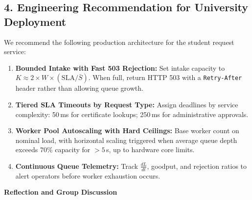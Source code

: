 \documentclass[11pt]{article}
\begin{document}
\subsection*{4. Engineering Recommendation for University Deployment}
We recommend the following production architecture for the student request service:
\begin{enumerate}[leftmargin=1.4em, itemsep=0.15em]
    \item \textbf{Bounded Intake with Fast 503 Rejection:} Set intake capacity to $K \approx 2 \times W \times (\text{SLA} / \bar{S})$. When full, return HTTP 503 with a \texttt{Retry-After} header rather than allowing queue growth.
    \item \textbf{Tiered SLA Timeouts by Request Type:} Assign deadlines by service complexity: 50\,ms for certificate lookups; 250\,ms for administrative approvals.
    \item \textbf{Worker Pool Autoscaling with Hard Ceilings:} Base worker count on nominal load, with horizontal scaling triggered when average queue depth exceeds 70\% capacity for $>5$\,s, up to hardware core limits.
    \item \textbf{Continuous Queue Telemetry:} Track $\frac{dL}{dt}$, goodput, and rejection ratios to alert operators before worker exhaustion occurs.
\end{enumerate}


\newpage
{\centering\fontsize{14}{17}\selectfont\textbf{Reflection and Group Discussion}\par}
\vspace{0.6em}
\end{document}
